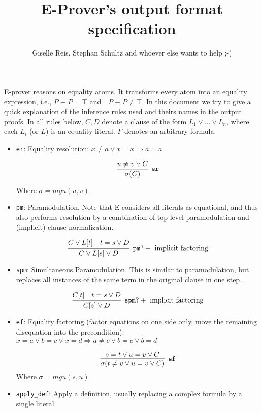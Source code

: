 \documentclass[a4paper, 11pt]{article}
\title{E-Prover's output format specification}
\author{Giselle Reis, Stephan Schultz and whoever
else wants to help ;-)}
\begin{document}
\maketitle

E-prover reasons on equality atoms. It transforms every atom into an equality
expression, i.e., $P \equiv P = \top$ and $\neg P \equiv P \neq \top$.
%
In this document we try to give a quick explanation of the inference rules used
and theirs names in the output proofs. In all rules below, $C, D$ denote a
clause of the form $L_1 \vee ... \vee L_n$, where each $L_i$ (or $L$) is an
equality literal. $F$ denotes an arbitrary formula.

\begin{itemize}
\item \texttt{er}: 
  Equality resolution: $x \neq a \vee x = x \Rightarrow a = a$

  \[
  \infer[\mathtt{er}]{\sigma(C)}{u \neq v \vee C}
  \]

  Where $\sigma = mgu(u,v)$.

\item \texttt{pm}: 
  Paramodulation. Note that E considers all literals as
  equational, and thus also performs resolution by a combination of top-level
  paramodulation and (implicit) clause normalization.

  \[
  \infer[\mathtt{pm?} + \mbox{ implicit factoring}]{C \vee L[s] \vee D}{
    C \vee L[t] &
    t = s \vee D
  }
  \]

\item \texttt{spm}: 
  Simultaneous Paramodulation. This is similar to
  paramodulation, but replaces all instances of the same term in the original
  clause in one step.

  \[
  \infer[\mathtt{spm?} + \mbox{ implicit factoring}]{C[s] \vee D}{
    C[t] &
    t = s \vee D
  }
  \]

\item \texttt{ef}: 
  Equality factoring (factor equations on one side only, move
  the remaining disequation into the precondition): 
  \newline
  $x = a \vee b = c \vee x = d \Rightarrow a \neq c \vee b = c \vee b = d$

  \[
  \infer[\mathtt{ef}]{\sigma(t \neq v \vee u = v \vee C)}{
    s = t \vee u = v \vee C
  }
  \]
  Where $\sigma = mgu(s,u)$.

\item \texttt{apply\_def}: 
  Apply a definition, usually replacing a complex
  formula by a single literal.


\end{itemize}
\end{document}
